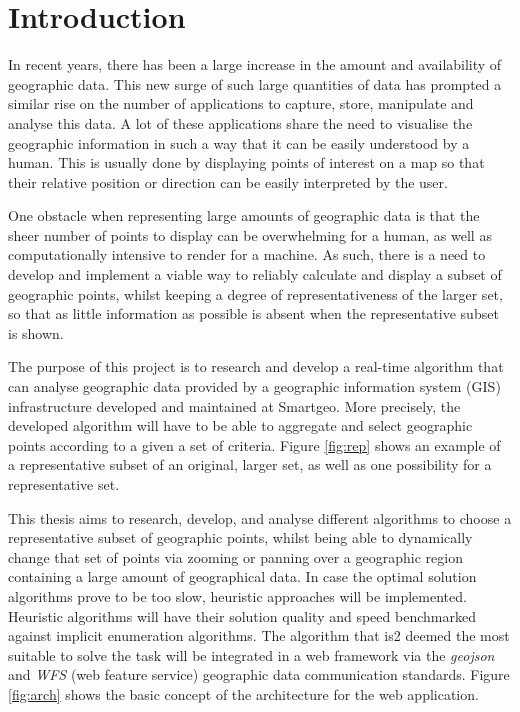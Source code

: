 \cleardoublepage
\chapter{Introduction}
\label{chap:intro}

In recent years, there has been a large increase in the amount and availability of geographic data. This new surge of such large quantities of data has prompted a similar rise on the number of applications to capture, store, manipulate and analyse this data.
A lot of these applications share the need to visualise the geographic information in such a way that it can be easily understood by a human.
This is usually done by displaying points of interest on a map so that their relative position or direction can be easily interpreted by the user.

One obstacle when representing large amounts of geographic data is that the sheer number of points to display can be overwhelming for a human, as well as computationally intensive to render for a machine. As such, there is a need to develop and implement a viable way to reliably calculate and display a subset of geographic points, whilst keeping a degree of representativeness of the larger set, so that as little information as possible is absent when the representative subset is shown.

The purpose of this project is to research and develop a real-time algorithm that can analyse geographic data provided by a geographic information system (GIS) infrastructure developed and maintained at Smartgeo. More precisely, the developed algorithm will have to be able to aggregate and select geographic points according to a given a set of criteria. Figure \ref{fig:rep} shows an example of a representative subset of an original, larger set, as well as one possibility for a representative set.



This thesis aims to research, develop, and analyse different algorithms to choose a representative subset of geographic points, whilst being able to dynamically change that set of points via zooming or panning over a geographic region containing a large amount of geographical data. In case the optimal solution algorithms prove to be too slow, heuristic approaches will be implemented. Heuristic algorithms will have their solution quality and speed benchmarked against implicit enumeration algorithms.
The algorithm that is2 deemed the most suitable to solve the task will be integrated in a web framework via the \emph{geojson} and \emph{WFS} (web feature service) geographic data communication standards. Figure \ref{fig:arch} shows the basic concept of the architecture for the web application.

